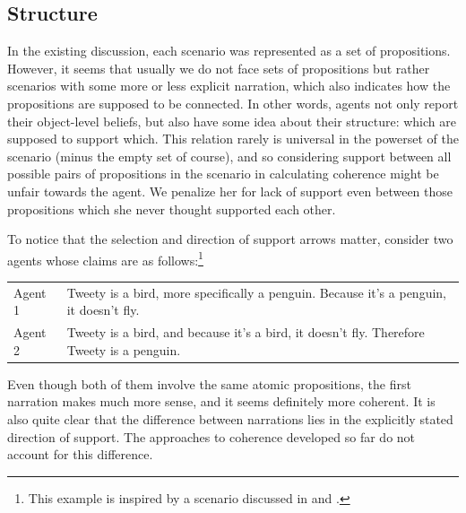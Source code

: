 \documentclass[10pt,]{scrartcl}
\begin{document}
\subsection{Structure}

In the existing discussion, each scenario was represented as a set of
propositions. However, it seems that usually we do not face sets of
propositions but rather scenarios with some more or less explicit
narration, which also indicates how the propositions are supposed to be
connected. In other words, agents not only report their object-level
beliefs, but also have some idea about their structure: which are
supposed to support which. This relation rarely is universal in the
powerset of the scenario (minus the empty set of course), and so
considering support between all possible pairs of propositions in the
scenario in calculating coherence might be unfair towards the agent. We
penalize her for lack of support even between those propositions which
she never thought supported each other.

To notice that the selection and direction of support arrows matter, 
consider two agents whose claims are as follows:\footnote{This example is inspired by a scenario discussed in \citep[50]{bovens2004bayesian} and \citep{Meijs2007Alleged}.}

\vspace{2mm}

\begin{center}
\begin{tabular}{lp{9cm}}
\textsf{Agent 1}     & Tweety is a bird, more specifically a penguin. Because it’s a penguin, it doesn’t fly.  \\
\textsf{Agent 2}     &  Tweety is a bird, and because it’s a bird, it doesn't fly. Therefore Tweety is a penguin. \\
\end{tabular}
\end{center}

\vspace{2mm}

\noindent Even though both of them involve the same atomic propositions,
the first narration makes much more sense, and it seems definitely more
coherent. It is also quite clear that the difference between narrations
lies in the explicitly stated direction of support. The approaches to
coherence developed so far do not account for this difference.
\end{document}
